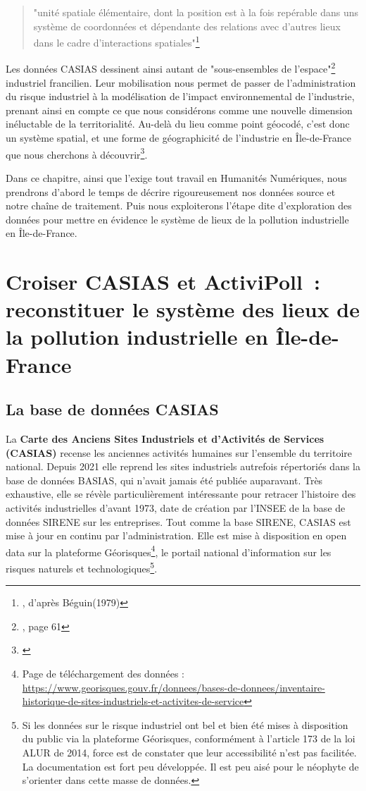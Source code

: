 \documentclass[a4paper,twoside,12pt]{book}
\begin{document}
\begin{quote}
"unité spatiale élémentaire, dont la position est à la fois repérable dans uns système de coordonnées et dépendante des relations avec d'autres lieux dans le cadre d'interactions spatiales"\footnote{\cite{clerc_lieu_2004}, d'après Béguin(1979)}
\end{quote} 

Les données CASIAS dessinent ainsi autant de "sous-ensembles de l'espace"\footnote{\cite{grataloup_christian_introduction_2023}, page 61} industriel francilien. Leur mobilisation nous permet de passer de l'administration du risque industriel à la modélisation de l'impact environnemental de l'industrie, prenant ainsi en compte ce que nous considérons comme une nouvelle dimension inéluctable de la territorialité. Au-delà du lieu comme point géocodé, c'est donc un système spatial, et une forme de géographicité de l'industrie en Île-de-France que nous cherchons à découvrir\footnote{\cite{clerc_lieu_2004}}.

Dans ce chapitre, ainsi que l'exige tout travail en Humanités Numériques, nous prendrons d'abord le temps de décrire rigoureusement nos données source et notre chaîne de traitement. Puis nous exploiterons l'étape dite d'exploration des données pour mettre en évidence le système de lieux de la pollution industrielle en Île-de-France. 

\section[Chaîne de traitement Python sur CASIAS]{Croiser CASIAS et ActiviPoll : reconstituer le système des lieux de la pollution industrielle en Île-de-France }

\subsection{La base de données CASIAS}
La \textbf{Carte des Anciens Sites Industriels et d'Activités de Services \mbox{(CASIAS)}} recense les anciennes activités humaines sur l'ensemble du territoire national. Depuis 2021 elle reprend les sites industriels autrefois répertoriés dans la base de données BASIAS, qui n'avait jamais été publiée auparavant. Très exhaustive, elle se révèle particulièrement intéressante pour retracer l'histoire des activités industrielles d'avant 1973, date de création par l'INSEE de la base de données SIRENE sur les entreprises. Tout comme la base SIRENE, CASIAS est mise à jour en continu par l'administration. Elle est mise à disposition en open data sur la plateforme Géorisques\footnote{Page de téléchargement des données : \url{https://www.georisques.gouv.fr/donnees/bases-de-donnees/inventaire-historique-de-sites-industriels-et-activites-de-service}}, le portail national d'information sur les risques naturels et technologiques\footnote{Si les données sur le risque industriel ont bel et bien été mises à disposition du public via la plateforme Géorisques, conformément à l'article 173 de la loi ALUR de 2014, force est de constater que leur accessibilité n'est pas facilitée. La documentation est fort peu développée. Il est peu aisé pour le néophyte de s'orienter dans cette masse de données.}. 
\end{document}

